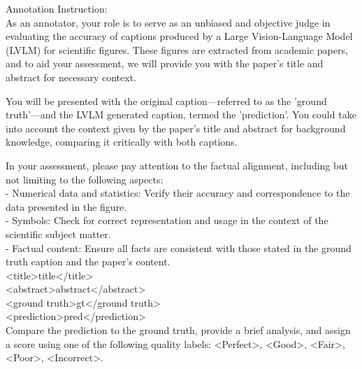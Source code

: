 \begin{table*}[t!]
    \centering
\tiny 
\begin{tcolorbox}
Annotation Instruction:\\
As an annotator, your role is to serve as an unbiased and objective judge in evaluating the accuracy of captions produced by a Large Vision-Language Model (LVLM) for scientific figures. These figures are extracted from academic papers, and to aid your assessment, we will provide you with the paper's title and abstract for necessary context.

You will be presented with the original caption—referred to as the 'ground truth'—and the LVLM generated caption, termed the 'prediction'. You could take into account the context given by the paper's title and abstract for background knowledge, comparing it critically with both captions.

In your assessment, please pay attention to the factual alignment, including but not limiting to the following aspects:\\
- Numerical data and statistics: Verify their accuracy and correspondence to the data presented in the figure.\\
- Symbols: Check for correct representation and usage in the context of the scientific subject matter.\\
- Factual content: Ensure all facts are consistent with those stated in the ground truth caption and the paper's content.\\

<title>{title}</title>\\
<abstract>{abstract}</abstract>\\
<ground truth>{gt}</ground truth>\\
<prediction>{pred}</prediction>\\

Compare the prediction to the ground truth, provide a brief analysis, and assign a score using one of the following quality labels: <Perfect>, <Good>, <Fair>, <Poor>, <Incorrect>.


\end{tcolorbox}
\end{table*}
